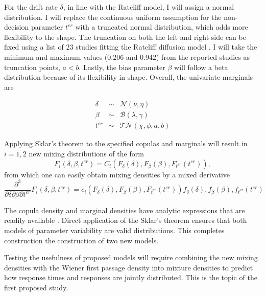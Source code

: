 \documentclass[12pt]{article}
\begin{document}
	For the drift rate $\delta$, in line with the Ratcliff model, I will assign a normal distribution. I will replace the continuous uniform assumption for the non-decision parameter $t^{er}$ with a truncated normal distribution, which adds more flexibility to the shape. The truncation on both the left and right side can be fixed using a list of $23$ studies fitting the Ratcliff diffusion model \citep{MatWag2009}. I will take the minimum and maximum values ($0.206$ and $0.942$) from the reported studies as truncation points, $a < b$.  Lastly, the bias parameter $\beta$ will follow a beta distribution because of its flexibility in shape. Overall, the univariate marginals are 

\begin{eqnarray}
\delta & \sim & \mathcal{N}(\nu, \eta) \nonumber \\
\beta & \sim & \mathcal{B}(\lambda, \gamma) \nonumber \\
t^{er} & \sim & \mathcal{TN}(\chi,\phi,a,b)
\end{eqnarray}
 
Applying Sklar’s theorem to the specified copulas and marginals will result in $i = 1, 2$ new mixing distributions of the form
\begin{equation}
F_i(\delta,\beta,t^{er}) = C_i(F_{\delta}(\delta),F_{\beta}(\beta),F_{t^{er}}(t^{er})),
\end{equation}
from which one can easily obtain mixing densities by a mixed derivative
\begin{equation}
\frac{\partial^3}{\partial\delta\partial\beta\partial t^{er}}F_i(\delta,\beta,t^{er}) = c_i(F_{\delta}(\delta),F_{\beta}(\beta),F_{t^{er}}(t^{er}))f_{\delta}(\delta),f_{\beta}(\beta),f_{t^{er}}(t^{er})
\end{equation}
 
	The copula density and marginal densities have analytic expressions that are readily available \citep{Nel2007,CasBer2002,JohKot1994,JohKot1995}. Direct application of the Sklar’s theorem ensures that both models of parameter variability are valid distributions. This completes construction the construction of two new models. 
    
	Testing the usefulness of proposed models will require combining the new mixing densities with the Wiener first passage density into mixture densities to predict how response times and responses are jointly distributed. This is the topic of the first proposed study.

\end{document}

